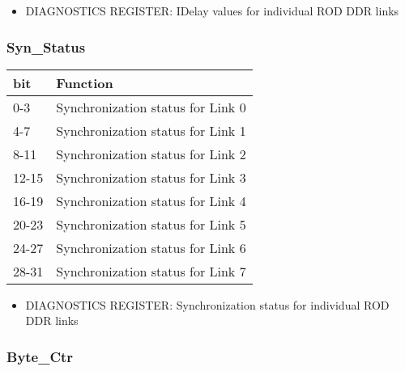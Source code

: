 \begin{itemize}
\item DIAGNOSTICS REGISTER: IDelay values for individual ROD DDR links
\end{itemize}



\subsubsection{Syn\_Status}

\begin {table}[H]
\begin{center}
\begin{tabular}{|l|l|}
\hline
\textbf{bit} & \textbf{Function} \\
\hline
0-3 & Synchronization status for Link 0 \\
\hline
4-7 & Synchronization status for Link 1 \\
\hline
8-11 & Synchronization status for Link 2 \\
\hline
12-15 & Synchronization status for Link 3 \\
\hline
16-19 & Synchronization status for Link 4 \\
\hline
20-23 & Synchronization status for Link 5 \\
\hline
24-27 & Synchronization status for Link 6 \\
\hline
28-31 & Synchronization status for Link 7 \\
\hline
\end{tabular}
\end{center}
\end{table}


\begin{itemize}
\item DIAGNOSTICS REGISTER: Synchronization status for individual ROD DDR links
\end{itemize}




\subsubsection{Byte\_Ctr}

